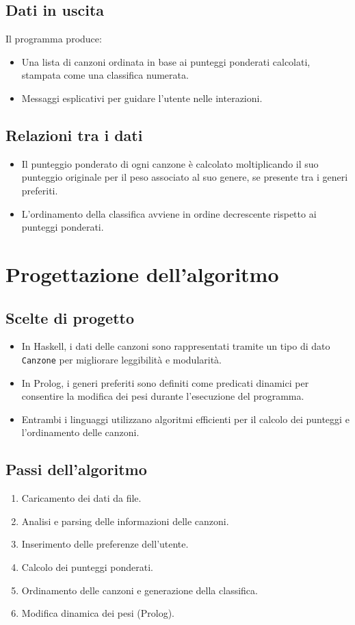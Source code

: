 \documentclass[a4paper,11pt]{article}
\begin{document}
\subsection{Dati in uscita}
Il programma produce:
\begin{itemize}
    \item Una lista di canzoni ordinata in base ai punteggi ponderati calcolati, stampata come una classifica numerata.
    \item Messaggi esplicativi per guidare l'utente nelle interazioni.
\end{itemize}

\subsection{Relazioni tra i dati}
\begin{itemize}
    \item Il punteggio ponderato di ogni canzone è calcolato moltiplicando il suo punteggio originale per il peso associato al suo genere, se presente tra i generi preferiti.
    \item L'ordinamento della classifica avviene in ordine decrescente rispetto ai punteggi ponderati.
\end{itemize}

\section{Progettazione dell'algoritmo}

\subsection{Scelte di progetto}
\begin{itemize}
    \item In Haskell, i dati delle canzoni sono rappresentati tramite un tipo di dato \texttt{Canzone} per migliorare leggibilità e modularità.
    \item In Prolog, i generi preferiti sono definiti come predicati dinamici per consentire la modifica dei pesi durante l'esecuzione del programma.
    \item Entrambi i linguaggi utilizzano algoritmi efficienti per il calcolo dei punteggi e l'ordinamento delle canzoni.
\end{itemize}

\subsection{Passi dell'algoritmo}
\begin{enumerate}
    \item Caricamento dei dati da file.
    \item Analisi e parsing delle informazioni delle canzoni.
    \item Inserimento delle preferenze dell'utente.
    \item Calcolo dei punteggi ponderati.
    \item Ordinamento delle canzoni e generazione della classifica.
    \item Modifica dinamica dei pesi (Prolog).
\end{enumerate}
\end{document}
